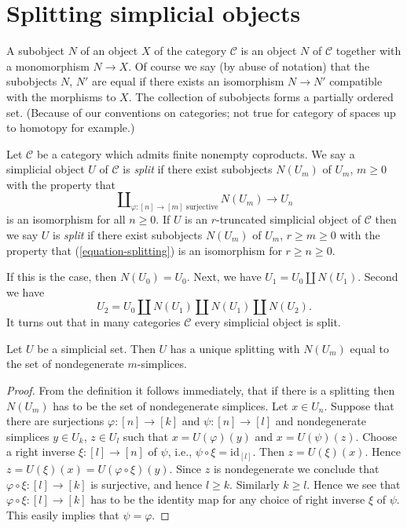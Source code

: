 \section{Splitting simplicial objects}
\label{section-splitting}

\noindent
A subobject $N$ of an object $X$ of the category $\mathcal{C}$
is an object $N$ of $\mathcal{C}$ together with a monomorphism
$N \to X$. Of course we say (by abuse of notation) that
the subobjects $N$, $N'$ are equal if there exists an isomorphism
$N \to N'$ compatible with the morphisms to $X$. The collection
of subobjects forms a partially ordered set. (Because of our
conventions on categories; not true for category of spaces
up to homotopy for example.)

\begin{definition}
\label{definition-split}
Let $\mathcal{C}$ be a category which admits finite nonempty coproducts.
We say a simplicial object $U$ of $\mathcal{C}$ is {\it split}
if there exist subobjects $N(U_m)$ of $U_m$, $m \geq 0$
with the property that
\begin{equation}
\label{equation-splitting}
\coprod\nolimits_{\varphi : [n] \to [m]\text{ surjective}}
N(U_m)
\longrightarrow
U_n
\end{equation}
is an isomorphism for all $n \geq 0$. If $U$ is an $r$-truncated
simplicial object of $\mathcal{C}$ then we say $U$ is {\it split}
if there exist subobjects $N(U_m)$ of $U_m$, $r \geq m \geq 0$
with the property that (\ref{equation-splitting})
is an isomorphism for $r \geq n \geq 0$.
\end{definition}

\noindent
If this is the case, then $N(U_0) = U_0$. Next, we have
$U_1 = U_0 \amalg N(U_1)$. Second we have
$$
U_2 = U_0 \amalg N(U_1) \amalg N(U_1) \amalg N(U_2).
$$
It turns out that in many categories $\mathcal{C}$
every simplicial object is split.

\begin{lemma}
\label{lemma-splitting-simplicial-sets}
Let $U$ be a simplicial set. Then $U$ has a unique splitting
with $N(U_m)$ equal to the set of nondegenerate $m$-simplices.
\end{lemma}

\begin{proof}
From the definition it follows immediately, that if there is a
splitting then $N(U_m)$ has to be the set of nondegenerate simplices.
Let $x \in U_n$. Suppose that there are surjections $\varphi : [n] \to [k]$
and $\psi : [n] \to [l]$ and nondegenerate simplices
$y \in U_k$, $z \in U_l$ such that $x = U(\varphi)(y)$
and $x = U(\psi)(z)$. Choose a right inverse $\xi : [l] \to [n]$
of $\psi$, i.e., $\psi \circ \xi = \text{id}_{[l]}$.
Then $z = U(\xi)(x)$. Hence $z = U(\xi)(x) = U(\varphi \circ \xi)(y)$.
Since $z$ is nondegenerate we conclude that $\varphi \circ \xi :
[l] \to [k]$ is surjective, and hence $l \geq k$. Similarly
$k \geq l$. Hence we see that $\varphi \circ \xi : [l] \to [k]$
has to be the identity map for any choice of right inverse
$\xi$ of $\psi$. This easily implies that $\psi = \varphi$.
\end{proof}

